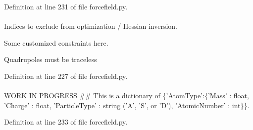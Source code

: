 \-Definition at line 231 of file forcefield.\-py.

\hypertarget{classforcebalance_1_1forcefield_1_1FF_aa630b2a2142d81e30c5751ed13a7b777}{
\paragraph[{excision}]{}}\label{classforcebalance_1_1forcefield_1_1FF_aa630b2a2142d81e30c5751ed13a7b777}


\-Indices to exclude from optimization / \-Hessian inversion. 

\-Some customized constraints here.

\-Quadrupoles must be traceless 

\-Definition at line 227 of file forcefield.\-py.

\hypertarget{classforcebalance_1_1forcefield_1_1FF_a30ed6d22628b40ff926588297550568f}{
\paragraph[{\-F\-F\-Atom\-Types}]{}}\label{classforcebalance_1_1forcefield_1_1FF_a30ed6d22628b40ff926588297550568f}


\-W\-O\-R\-K \-I\-N \-P\-R\-O\-G\-R\-E\-S\-S \#\# \-This is a dictionary of \{'\-Atom\-Type'\-:\{'\-Mass' \-: float, '\-Charge' \-: float, '\-Particle\-Type' \-: string ('\-A', '\-S', or '\-D'), '\-Atomic\-Number' \-: int\}\}. 



\-Definition at line 233 of file forcefield.\-py.

\hypertarget{classforcebalance_1_1forcefield_1_1FF_a70d7c27557dcefd0ae66a1f1cc4ec211}{
\paragraph[{ffdata}]{}}\label{classforcebalance_1_1forcefield_1_1FF_a70d7c27557dcefd0ae66a1f1cc4ec211}


